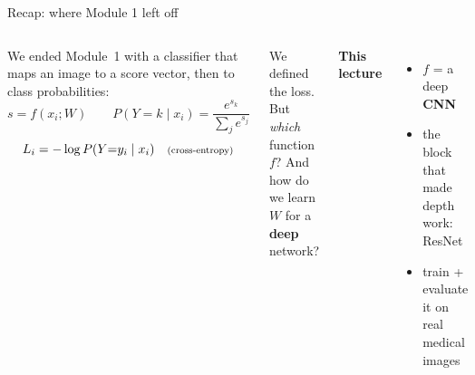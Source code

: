 \documentclass[
11pt,notheorems,hyperref={pdfauthor=whatever}
]{beamer}
\begin{document}

\begin{frame}{Recap: where Module 1 left off}
\small
\begin{columns}[c,onlytextwidth]
    We ended Module~1 with a classifier that maps an image to a score vector, then to
    class probabilities:
    \[
    s = f(x_i; W)
    \qquad
    P(Y{=}k \mid x_i) = \frac{e^{s_k}}{\sum_j e^{s_j}}
    \]
    \[
    L_i = -\log P(Y{=}y_i \mid x_i)
    \quad\text{\scriptsize(cross-entropy)}
    \]

    \vspace{0.6em}
    \begin{tcolorbox}[medicalglass, title=\textbf{\color{accTeal}The open question}]
    We defined the \alert{loss}. But \emph{which} function $f$? And how do we \alert{learn $W$}
    for a \textbf{deep} network?
    \end{tcolorbox}

    \centering
    \textbf{\footnotesize This lecture}
    \begin{itemize}\small
        \item[$\rightarrow$] $f$ = a deep \textbf{CNN}
        \item[$\rightarrow$] the block that made depth work: \alert{ResNet}
        \item[$\rightarrow$] train + evaluate it on real medical images
    \end{itemize}
\end{columns}
\end{frame}
\end{document}
